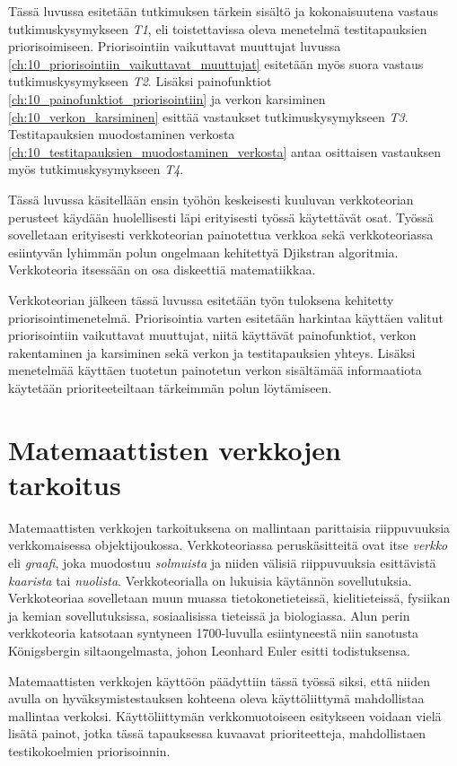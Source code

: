 Tässä luvussa esitetään tutkimuksen tärkein sisältö ja kokonaisuutena vastaus tutkimuskysymykseen \emph{T1}, eli toistettavissa oleva menetelmä testitapauksien priorisoimiseen.
Priorisointiin vaikuttavat muuttujat luvussa \ref{ch:10_priorisointiin_vaikuttavat_muuttujat} esitetään myös suora vastaus tutkimuskysymykseen \emph{T2}.
Lisäksi painofunktiot \ref{ch:10_painofunktiot_priorisointiin} ja verkon karsiminen \ref{ch:10_verkon_karsiminen} esittää vastaukset tutkimuskysymykseen \emph{T3}.
Testitapauksien muodostaminen verkosta \ref{ch:10_testitapauksien_muodostaminen_verkosta} antaa osittaisen vastauksen myös tutkimuskysymykseen \emph{T4}.

Tässä luvussa käsitellään ensin työhön keskeisesti kuuluvan verkkoteorian perusteet käydään huolellisesti läpi erityisesti työssä käytettävät osat.
Työssä sovelletaan erityisesti verkkoteorian painotettua verkkoa sekä verkkoteoriassa esiintyvän lyhimmän polun ongelmaan kehitettyä Djikstran algoritmia.
Verkkoteoria itsessään on osa diskeettiä matematiikkaa.

Verkkoteorian jälkeen tässä luvussa esitetään työn tuloksena kehitetty priorisointimenetelmä.
Priorisointia varten esitetään harkintaa käyttäen valitut priorisointiin vaikuttavat muuttujat, niitä käyttävät painofunktiot, verkon rakentaminen ja karsiminen sekä verkon ja testitapauksien yhteys.
Lisäksi menetelmää käyttäen tuotetun painotetun verkon sisältämää informaatiota käytetään prioriteeteiltaan tärkeimmän polun löytämiseen.

\section{Matemaattisten verkkojen tarkoitus} \label{ch:09_matemaattisten_verkkojen_tarkoitus}

  Matemaattisten verkkojen tarkoituksena on mallintaan parittaisia riippuvuuksia verkkomaisessa objektijoukossa.
  Verkkoteoriassa peruskäsitteitä ovat itse \emph{verkko} eli \emph{graafi}, joka muodostuu \emph{solmuista} ja niiden välisiä riippuvuuksia esittävistä \emph{kaarista} tai \emph{nuolista}.
  Verkkoteorialla on lukuisia käytännön sovellutuksia. Verkkoteoriaa sovelletaan muun muassa tietokonetieteissä, kielitieteissä, fysiikan ja kemian sovellutuksissa, sosiaalisissa tieteissä ja biologiassa.
  Alun perin verkkoteoria katsotaan syntyneen 1700-luvulla esiintyneestä niin sanotusta Königsbergin siltaongelmasta, johon Leonhard Euler esitti todistuksensa.

  Matemaattisten verkkojen käyttöön päädyttiin tässä työssä siksi, että niiden avulla on hyväksymistestauksen kohteena oleva käyttöliittymä mahdollistaa mallintaa verkoksi.
  Käyttöliittymän verkkomuotoiseen esitykseen voidaan vielä lisätä painot, jotka tässä tapauksessa kuvaavat prioriteetteja, mahdollistaen testikokoelmien priorisoinnin.

